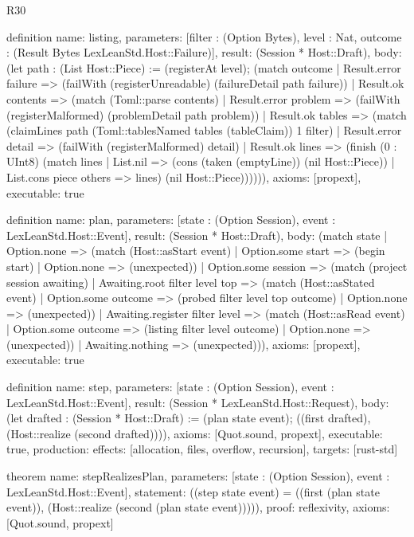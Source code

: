 \begin{lexlean}{R30}
\begin{semanticmodule}
definition{
  name: listing,
  parameters: [filter : (Option Bytes), level : Nat, outcome : (Result Bytes LexLeanStd.Host::Failure)],
  result: (Session * Host::Draft),
  body: (let path : (List Host::Piece) := (registerAt level); (match outcome
    | Result.error failure => (failWith (registerUnreadable) (failureDetail path failure))
    | Result.ok contents => (match (Toml::parse contents)
      | Result.error problem => (failWith (registerMalformed) (problemDetail path problem))
      | Result.ok tables => (match (claimLines path (Toml::tablesNamed tables (tableClaim)) 1 filter)
        | Result.error detail => (failWith (registerMalformed) detail)
        | Result.ok lines => (finish (0 : UInt8) (match lines
          | List.nil => (cons (taken (emptyLine)) (nil Host::Piece))
          | List.cons piece others => lines) (nil Host::Piece)))))),
  axioms: [propext],
  executable: true
}

definition{
  name: plan,
  parameters: [state : (Option Session), event : LexLeanStd.Host::Event],
  result: (Session * Host::Draft),
  body: (match state
    | Option.none => (match (Host::asStart event)
      | Option.some start => (begin start)
      | Option.none => (unexpected))
    | Option.some session => (match (project session awaiting)
      | Awaiting.root filter level top => (match (Host::asStated event)
        | Option.some outcome => (probed filter level top outcome)
        | Option.none => (unexpected))
      | Awaiting.register filter level => (match (Host::asRead event)
        | Option.some outcome => (listing filter level outcome)
        | Option.none => (unexpected))
      | Awaiting.nothing => (unexpected))),
  axioms: [propext],
  executable: true
}

definition{
  name: step,
  parameters: [state : (Option Session), event : LexLeanStd.Host::Event],
  result: (Session * LexLeanStd.Host::Request),
  body: (let drafted : (Session * Host::Draft) := (plan state event); ((first drafted), (Host::realize (second drafted)))),
  axioms: [Quot.sound, propext],
  executable: true,
  production: {effects: [allocation, files, overflow, recursion], targets: [rust-std]}
}

theorem{
  name: stepRealizesPlan,
  parameters: [state : (Option Session), event : LexLeanStd.Host::Event],
  statement: ((step state event) = ((first (plan state event)), (Host::realize (second (plan state event))))),
  proof: reflexivity{},
  axioms: [Quot.sound, propext]
}
\end{semanticmodule}
\end{lexlean}
